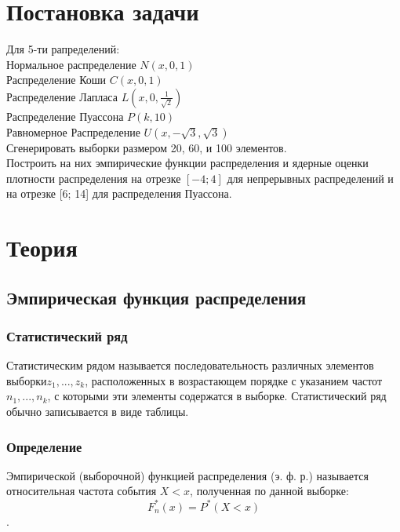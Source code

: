\documentclass[a4]{article}
\begin{document}
	
	\newpage
	\tableofcontents{}
	\newpage
	\listoffigures
	\newpage
	\listoftables
	\newpage
	
	
	\section{Постановка задачи}
	
	Для 5-ти рапределений:\\
		Нормальное распределение $N(x,0,1)$\\
		Распределение Коши $C(x,0,1)$\\
		Распределение Лапласа $L( x,0,\frac{1}{\sqrt{2}})$\\
		Распределение Пуассона $P(k, 10)$\\
		Равномерное Распределение $U(x,-\sqrt{3}, \sqrt{3})$\\
		
		Сгенерировать выборки размером 20, 60, и 100 элементов.\\
		Построить на них эмпирические функции распределения и ядерные
		оценки плотности распределения на отрезке $[-4; 4]$ для непрерывных
		распределений и на отрезке [6; 14] для распределения Пуассона.
		
	
	\section{Теория}
		\subsection{Эмпирическая функция распределения}
			\subsubsection{Статистический ряд}
				Статистическим рядом называется последовательность различных элементов выборки$ z_1, ... , z_k$, расположенных в возрастающем порядке с указанием частот $n_1, ... , n_k$, с которыми эти элементы содержатся в выборке.
				Статистический ряд обычно записывается в виде таблицы.
			\subsubsection{Определение}
				Эмпирической (выборочной) функцией распределения (э. ф. р.) называется
				относительная частота события $X < x$, полученная по данной выборке:
				$$F^*_n(x) = P^*(X<x)$$.
\end{document}

